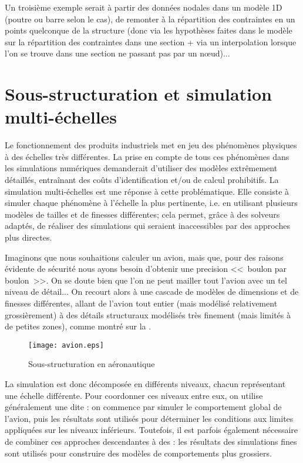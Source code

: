 \medskip
Un troisième exemple serait à partir des données nodales dans un modèle 1D
(poutre ou barre selon le cas), de remonter à la répartition des contraintes en un
points quelconque de la structure (donc via les hypothèses faites dans le modèle
sur la répartition des contraintes dans une section + via un interpolation lorsque l'on se
trouve dans une section ne passant pas par un nœud)...

\ifVersionAvecExemplesSepares\else
\fi


\medskip
\section{Sous-structuration et simulation multi-échelles}\label{Sec-ssstruc}

Le fonctionnement des produits industriels met en jeu des phénomènes physiques à des
échelles très différentes.
La prise en compte de tous ces phénomènes dans les simulations numériques demanderait
d'utiliser des modèles extrêmement détaillés, entraînant des coûts d'identification
et/ou de calcul prohibitifs.
La simulation multi-échelles est une réponse à cette problématique.
Elle consiste à simuler chaque phénomène à l'échelle la plus pertinente,
i.e. en utilisant plusieurs modèles de tailles et de finesses différentes; cela permet,
grâce à des solveurs adaptés, de réaliser des simulations qui seraient inaccessibles
par des approches plus directes.

\medskip
Imaginons que nous souhaitions calculer un avion, mais que, pour des raisons
évidente de sécurité nous ayons besoin d'obtenir une precision <<~boulon par boulon~>>.
On se doute bien que l'on ne peut mailler tout l'avion avec un tel niveau de détail...
On recourt alors à une cascade de modèles de dimensions et de finesses différentes,
allant de l'avion tout entier (mais modélisé relativement grossièrement) à
des détails structuraux modélisés très finement (mais limités à de petites zones), comme
montré sur la .
\begin{figure}[ht]
\centering\texttt{[image: avion.eps]}
\caption{Sous-structuration en aéronautique}\label{Fig-avion}
\end{figure}

La simulation est donc décomposée en différents niveaux, chacun représentant une échelle
différente. Pour coordonner ces niveaux entre eux, on utilise généralement une
 dite :
on commence par simuler le comportement global de l'avion, puis les résultats sont utilisés pour
déterminer les conditions aux limites appliquées sur les niveaux inférieurs.
Toutefois, il est parfois également nécessaire de combiner ces approches descendantes
à des :
les résultats des simulations fines sont utilisés pour construire des modèles de comportements
plus grossiers.

